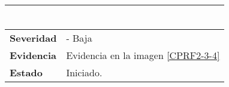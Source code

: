 \begin{longtable}{|l|l|}
\begin{tabular}[c]{@{}l@{}}
\end{tabular}                                                                                                                                                                                                                                                             \\ \hline
\textbf{Severidad}                                                                      &    - Baja                                                                                                                                                                                                                                                            \\ \hline
\textbf{Evidencia}                                                                      &  Evidencia en la imagen \ref{CPRF2-3-4}                                                                                                                                                                                                                                                         \\ \hline
\textbf{Estado}                                                                         & Iniciado.                                                                                                                                                                                                                                                   \\ \hline
\end{longtable}